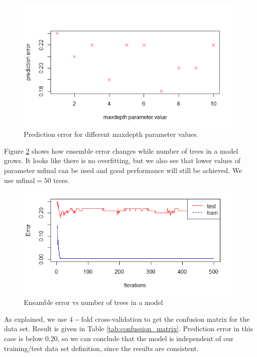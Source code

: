 \documentclass{article}
\begin{document}
\begin{figure}[h] %
\includegraphics[scale=0.65]{figs/maxdepth_values}
\centering
\caption{Prediction error for different {\selectfont maxdepth} parameter values.} \label{fig:maxdepth_parameter_values}
\end{figure}

Figure \ref{fig:mfinal_parameter_values} shows how ensemble error changes while number of trees in a model grows. It looks like there is no overfitting, but we also see that lower values of parameter {\selectfont mfinal} can be used and good performance will still be achieved. We use {\selectfont mfinal$=50$} trees.

\begin{figure}[h] %
\includegraphics[scale=0.65]{figs/mfinal_500}
\centering
\caption{Ensamble error vs number of trees in a model} \label{fig:mfinal_parameter_values}
\end{figure} 

As explained, we use $4-$fold cross-validation to get the confusion matrix for the data set. Result is given in Table \ref{tab:confussion_matrix}. Prediction error in this case is below $0.20$, so we can conclude that the model is independent of our training$/$test data set definition, since the results are consistent.
\end{document}
